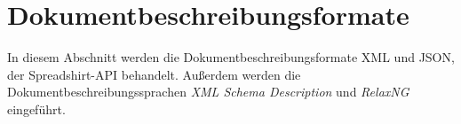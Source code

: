 \section{Dokumentbeschreibungsformate}
\label{sec:document_description_formats}

In diesem Abschnitt werden die Dokumentbeschreibungsformate \gls{XML} und \gls{JSON}, der Spreadshirt-API behandelt. Außerdem werden die Dokumentbeschreibungssprachen \emph{XML Schema Description} und \emph{RelaxNG} eingeführt.






